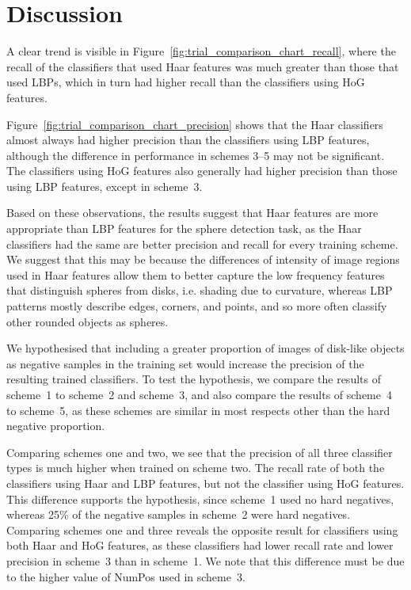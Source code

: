 \documentclass{sig-alternate-05-2015}
\begin{document}
	\section{Discussion} {


		A clear trend is visible in Figure~\ref{fig:trial_comparison_chart_recall}, where the recall of the classifiers that used Haar features was much greater than those that used LBPs, which in turn had higher recall than the classifiers using HoG features.

		Figure~\ref{fig:trial_comparison_chart_precision} shows that the Haar classifiers almost always had higher precision than the classifiers using LBP features, although the difference in performance in schemes 3--5 may not be significant.
		The classifiers using HoG features also generally had higher precision than those using LBP features, except in scheme~3.

		Based on these observations, the results suggest that Haar features are more appropriate than LBP features for the sphere detection task, as the Haar classifiers had the same are better precision and recall for every training scheme.
		We suggest that this may be because the differences of intensity of image regions used in Haar features allow them to better capture the low frequency features that distinguish spheres from disks, i.e. shading due to curvature, whereas LBP patterns mostly describe edges, corners, and points, and so more often classify other rounded objects as spheres.

		We hypothesised that including a greater proportion of images of disk-like objects as negative samples in the training set would increase the precision of the resulting trained classifiers.
		To test the hypothesis, we compare the results of scheme~1 to scheme~2 and scheme~3, and also compare the results of scheme~4 to scheme~5, as these schemes are similar in most respects other than the hard negative proportion.

		Comparing schemes one and two, we see that the precision of all three classifier types is much higher when trained on scheme two. The recall rate of both the classifiers using Haar and LBP features, but not the classifier using HoG features.
		This difference supports the hypothesis, since scheme~1 used no hard negatives, whereas 25\% of the negative samples in scheme~2 were hard negatives.
		Comparing schemes one and three reveals the opposite result for classifiers using both Haar and HoG features, as these classifiers had lower recall rate and lower precision in scheme~3 than in scheme~1. We note that this difference must be due to the higher value of NumPos used in scheme~3.

}
\end{document}
